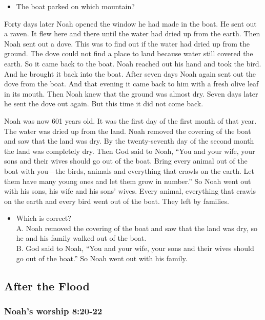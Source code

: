 \begin{itemize}
\item The boat parked on which mountain?
\end{itemize}

Forty days later Noah opened the window he had made in the boat. He sent out a raven. It flew here and there until the water had dried up from the earth. Then Noah sent out a dove. This was to find out if the water had dried up from the ground. The dove could not find a place to land because water still covered the earth. So it came back to the boat. Noah reached out his hand and took the bird. And he brought it back into the boat. After seven days Noah again sent out the dove from the boat. And that evening it came back to him with a fresh olive leaf in its mouth. Then Noah knew that the ground was almost dry. Seven days later he sent the dove out again. But this time it did not come back.

Noah was now 601 years old. It was the first day of the first month of that year. The water was dried up from the land. Noah removed the covering of the boat and saw that the land was dry. By the twenty-seventh day of the second month the land was completely dry. Then God said to Noah, “You and your wife, your sons and their wives should go out of the boat. Bring every animal out of the boat with you—the birds, animals and everything that crawls on the earth. Let them have many young ones and let them grow in number.” So Noah went out with his sons, his wife and his sons’ wives. Every animal, everything that crawls on the earth and every bird went out of the boat. They left by families.

\begin{itemize}
\item Which is correct?\\
A. Noah removed the covering of the boat and saw that the land was dry, so he and his family walked out of the boat.\\
B. God said to Noah, “You and your wife, your sons and their wives should go out of the boat.” So Noah went out with his family.
\end{itemize}

\subsection{After the Flood}
\subsubsection{Noah's worship 8:20-22}


